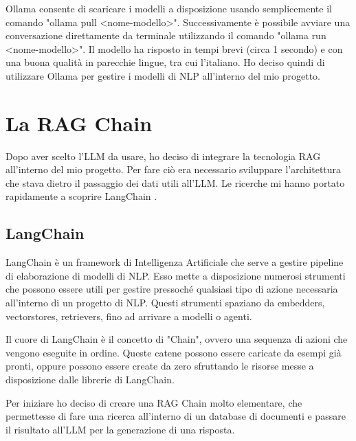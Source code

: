 Ollama consente di scaricare i modelli a disposizione usando semplicemente il comando "ollama pull <nome-modello>". Successivamente è possibile avviare una conversazione direttamente da terminale utilizzando il comando "ollama run <nome-modello>". Il modello ha risposto in tempi brevi (circa 1 secondo) e con una buona qualità in parecchie lingue, tra cui l'italiano. Ho deciso quindi di utilizzare Ollama per gestire i modelli di NLP all'interno del mio progetto.

\section{La RAG Chain}
Dopo aver scelto l'LLM da usare, ho deciso di integrare la tecnologia RAG all'interno del mio progetto. Per fare ciò era necessario sviluppare l'architettura che stava dietro il passaggio dei dati utili all'LLM. Le ricerche mi hanno portato rapidamente a scoprire LangChain \cite{langchain}.

\subsection{LangChain}
LangChain è un framework di Intelligenza Artificiale che serve a gestire pipeline di elaborazione di modelli di NLP. Esso mette a disposizione numerosi strumenti che possono essere utili per gestire pressoché qualsiasi tipo di azione necessaria all'interno di un progetto di NLP. Questi strumenti spaziano da embedders, vectorstores, retrievers, fino ad arrivare a modelli o agenti.

Il cuore di LangChain è il concetto di "Chain", ovvero una sequenza di azioni che vengono eseguite in ordine. Queste catene possono essere caricate da esempi già pronti, oppure possono essere create da zero sfruttando le risorse messe a disposizione dalle librerie di LangChain.

Per iniziare ho deciso di creare una RAG Chain molto elementare, che permettesse di fare una ricerca all'interno di un database di documenti e passare il risultato all'LLM per la generazione di una risposta.

